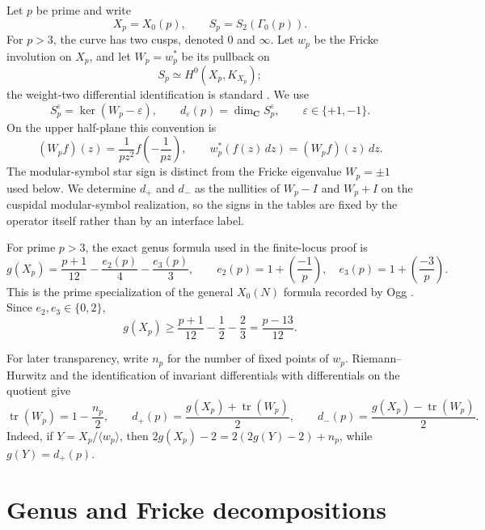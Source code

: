 \documentclass[11pt]{article}
\theoremstyle{definition}
\theoremstyle{remark}
\newcommand{\C}{\mathbf{C}}
\DeclareMathOperator{\tr}{tr}
\begin{document}
Let $p$ be prime and write
\[
  X_p=X_0(p), \qquad S_p=S_2(\Gamma_0(p)).
\]
For $p>3$, the curve has two cusps, denoted $0$ and $\infty$.  Let $w_p$
be the Fricke involution on $X_p$, and let $W_p=w_p^*$ be its pullback on
\[
  S_p \simeq H^0(X_p,K_{X_p});
\]
the weight-two differential identification is standard
\cite[Chapter~3, especially p.~36]{Stein2007}.  We use
\[
  S_p^{\varepsilon}=\ker(W_p-\varepsilon), \qquad
  d_\varepsilon(p)=\dim_{\C} S_p^\varepsilon,
  \qquad \varepsilon\in\{+1,-1\}.
\]
On the upper half-plane this convention is
\begin{equation}\label{eq:fricke-pullback}
  (W_p f)(z)=\frac{1}{p z^2}f\!\left(-\frac{1}{p z}\right),
  \qquad
  w_p^*(f(z)\,dz)=(W_p f)(z)\,dz.
\end{equation}
The modular-symbol star sign is distinct from the Fricke eigenvalue
$W_p=\pm1$ used below.  We determine $d_+$ and $d_-$ as the nullities of
$W_p-I$ and $W_p+I$ on the cuspidal modular-symbol realization, so the signs
in the tables are fixed by the operator itself rather than by an interface
label.

For prime $p>3$, the exact genus formula used in the finite-locus proof is
\begin{equation}\label{eq:genus}
  g(X_p)=\frac{p+1}{12}-\frac{e_2(p)}{4}-\frac{e_3(p)}{3},
  \qquad
  e_2(p)=1+\left(\frac{-1}{p}\right),\quad
  e_3(p)=1+\left(\frac{-3}{p}\right).
\end{equation}
This is the prime specialization of the general $X_0(N)$ formula recorded by
Ogg \cite[p.~455]{Ogg1974}.  Since $e_2,e_3\in\{0,2\}$,
\begin{equation}\label{eq:genusbound}
  g(X_p)\geq \frac{p+1}{12}-\frac{1}{2}-\frac{2}{3}
  =\frac{p-13}{12}.
\end{equation}

For later transparency, write $n_p$ for the number of fixed points of $w_p$.
Riemann--Hurwitz and the identification of invariant differentials with
differentials on the quotient give
\begin{equation}\label{eq:fixed-trace}
  \tr(W_p)=1-\frac{n_p}{2},
  \qquad
  d_+(p)=\frac{g(X_p)+\tr(W_p)}{2},
  \qquad
  d_-(p)=\frac{g(X_p)-\tr(W_p)}{2}.
\end{equation}
Indeed, if $Y=X_p/\langle w_p\rangle$, then
$2g(X_p)-2=2(2g(Y)-2)+n_p$, while $g(Y)=d_+(p)$.

\section{Genus and Fricke decompositions}
\end{document}
